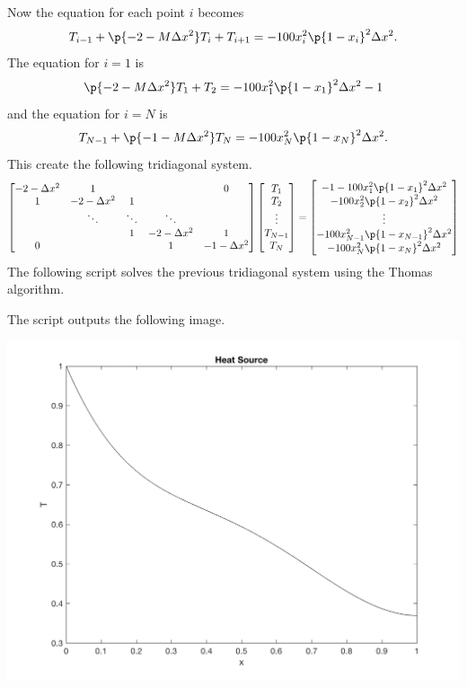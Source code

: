 \documentclass[11pt, oneside]{article}
\begin{document}
\begin{enumerate}
\begin{enumerate}
        Now the equation for each point $i$ becomes
        \[
          T_{i - 1} + \p{- 2 - M\Delta x^2}T_i + T_{i+1} = -100x_i^2 \p{1 - x_i}^2 \Delta x^2.
        \]
        The equation for $i = 1$ is
        \[
         \p{- 2 - M\Delta x^2}T_1 + T_2 = -100x_1^2 \p{1 - x_1}^2 \Delta x^2 - 1
        \]
        and the equation for $i = N$ is
        \[
          T_{N - 1} + \p{-1 - M\Delta x^2}T_N = -100x_N^2 \p{1 - x_N}^2 \Delta x^2.
        \]
        This create the following tridiagonal system.
        \[
          \begin{bmatrix}
            -2 - \Delta x^2 & 1 & & & 0 \\
            1 & -2 - \Delta x^2 & 1 &  \\
             & \ddots & \ddots & \ddots &  \\
             &  & 1 & -2 - \Delta x^2  & 1  \\
            0 &  &  & 1 & -1 - \Delta x^2
          \end{bmatrix}
          \begin{bmatrix}
            T_1 \\
            T_2 \\
            \vdots \\
            T_{N - 1} \\
            T_{N}
          \end{bmatrix}
          =
          \begin{bmatrix}
            -1 - 100x_1^2 \p{1 - x_1}^2 \Delta x^2 \\
            -100x_2^2 \p{1 - x_2}^2 \Delta x^2\\
            \vdots \\
            -100x_{N-1}^2 \p{1 - x_{N-1}}^2 \Delta x^2\\
            -100x_N^2 \p{1 - x_N}^2 \Delta x^2
          \end{bmatrix}
        \]
        The following script solves the previous tridiagonal system using the
        Thomas algorithm.
        
        The script outputs the following image.
        \begin{center}
          \includegraphics[scale=0.5]{Figures/02_04.png}

\end{center}
\end{enumerate}
\end{enumerate}
\end{document}
